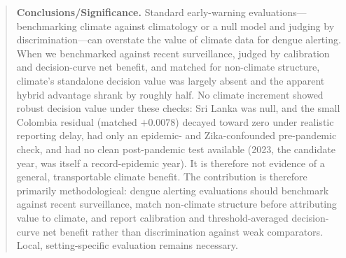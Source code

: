 \documentclass[11pt,a4paper]{article}
\begin{document}
\begin{abstract}
\noindent\textbf{Conclusions/Significance.}
Standard early-warning evaluations---benchmarking climate against climatology or a null model and judging by discrimination---can overstate the value of climate data for dengue alerting. When we benchmarked against recent surveillance, judged by calibration and decision-curve net benefit, and matched for non-climate structure, climate's standalone decision value was largely absent and the apparent hybrid advantage shrank by roughly half. No climate increment showed robust decision value under these checks: Sri Lanka was null, and the small Colombia residual (matched $+0.0078$) decayed toward zero under realistic reporting delay, had only an epidemic- and Zika-confounded pre-pandemic check, and had no clean post-pandemic test available (2023, the candidate year, was itself a record-epidemic year). It is therefore not evidence of a general, transportable climate benefit. The contribution is therefore primarily methodological: dengue alerting evaluations should benchmark against recent surveillance, match non-climate structure before attributing value to climate, and report calibration and threshold-averaged decision-curve net benefit rather than discrimination against weak comparators. Local, setting-specific evaluation remains necessary.
\end{abstract}

\end{document}
